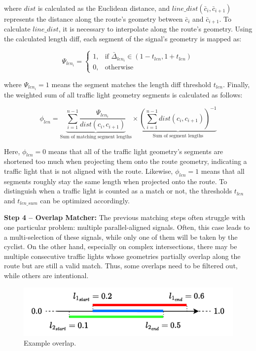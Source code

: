 where $dist$ is calculated as the Euclidean distance, and $line\_dist(\bar{c}_i, \bar{c}_{i+1})$ represents the distance along the route's geometry between $\bar{c}_i$ and $\bar{c}_{i+1}$. To calculate $line\_dist$, it is necessary to interpolate along the route's geometry. Using the calculated length diff, each segment of the signal's geometry is mapped as:

\begin{equation}
\Psi_{len_i} = 
    \begin{cases}
            1,& \text{if } \bar{\Delta}_{len_{i}} \in \left(1 - t_{len}, 1 + t_{len}\right)\\
            0,              & \text{otherwise}
        \end{cases}
\end{equation}

where $\Psi_{len_i} = 1$ means the segment matches the length diff threshold $t_{len}$. Finally, the weighted sum of all traffic light geometry segments is calculated as follows:

\begin{equation} 
\phi_{len} = 
    \underbrace{\sum_{i=1}^{n-1} 
    \frac{\Psi_{len_i}}{dist(c_i, c_{i+1})}}_{\text{Sum of matching segment lengths}}
    \times
    \underbrace{(\sum_{i=1}^{n-1} dist(c_i, c_{i+1}))^{-1}}_{\text{Sum of segment lengths}}
\end{equation}

Here, $\phi_{len} = 0$ means that all of the traffic light geometry's segments are shortened too much when projecting them onto the route geometry, indicating a traffic light that is not aligned with the route. Likewise, $\phi_{len} = 1$ means that all segments roughly stay the same length when projected onto the route. To distinguish when a traffic light is counted as a match or not, the thresholds $t_{len}$ and $t_{len\_sum}$ can be optimized accordingly.

\textbf{\color{cidarkblue}Step 4 -- Overlap Matcher:} The previous matching steps often struggle with one particular problem: multiple parallel-aligned signals. Often, this case leads to a multi-selection of these signals, while only one of them will be taken by the cyclist. On the other hand, especially on complex intersections, there may be multiple consecutive traffic lights whose geometries partially overlap along the route but are still a valid match. Thus, some overlaps need to be filtered out, while others are intentional.

\begin{figure}[b]
\centering
\includegraphics[width=0.5\linewidth]{images/overlap.drawio.pdf}
\caption{Example overlap.}
\label{fig:sg-matching-overlap-filter}
\end{figure}

